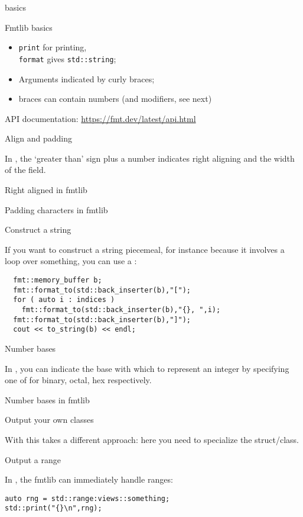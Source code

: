  {basics}

\begin{block}{Fmtlib basics}
  \label{sl:fmtlib-basic}
  \begin{itemize}
  \item \lstinline{print} for printing,\\
    \lstinline{format} gives \lstinline+std::string+;
  \item Arguments indicated by curly braces;
  \item braces can contain numbers (and modifiers, see next)
  \end{itemize}
  API documentation:
  \url{https://fmt.dev/latest/api.html}
\end{block}

 {Align and padding}

In , the `greater than' sign plus a number indicates
right aligning and the width of the field.

\begin{block}{Right aligned in fmtlib}
  \label{sl:fmtwidth}
\end{block}

\begin{block}{Padding characters in fmtlib}
  \label{sl:fmtleftpad}
\end{block}

 {Construct a string}

If you want to construct a string piecemeal,
for instance because it involves a loop over something,
you can use a :
\begin{lstlisting}
  fmt::memory_buffer b;
  fmt::format_to(std::back_inserter(b),"[");
  for ( auto i : indices )
    fmt::format_to(std::back_inserter(b),"{}, ",i);
  fmt::format_to(std::back_inserter(b),"]");
  cout << to_string(b) << endl;
\end{lstlisting}

 {Number bases}

In , you can indicate the base with which to represent an integer
by specifying one of  for binary, octal, hex respectively.

\begin{block}{Number bases in fmtlib}
  \label{sl:fmtbase}
\end{block}

 {Output your own classes}

With  this takes a different approach:
here you need to specialize the  struct/class.
%

 {Output a range}

In , the fmtlib can immediately handle ranges:
\begin{lstlisting}
auto rng = std::range:views::something;
std::print("{}\n",rng);
\end{lstlisting}
